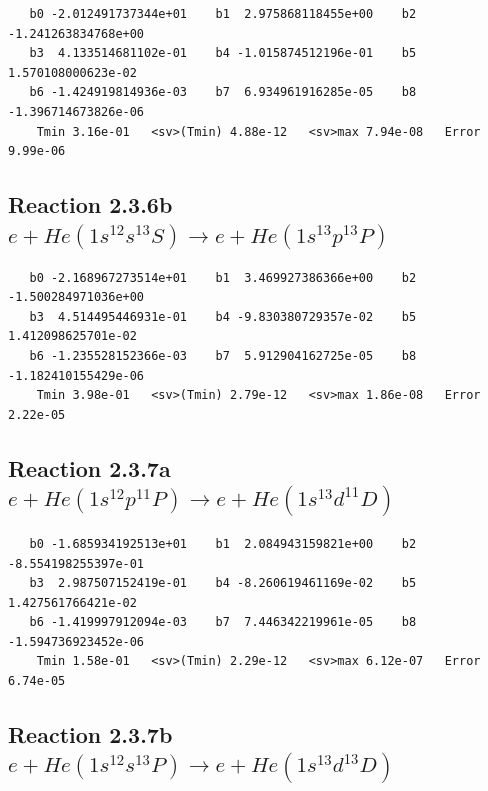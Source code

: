 \documentclass[12pt,dvipdfmx]{article}
\begin{document}
\begin{small}\begin{verbatim}
   b0 -2.012491737344e+01    b1  2.975868118455e+00    b2 -1.241263834768e+00
   b3  4.133514681102e-01    b4 -1.015874512196e-01    b5  1.570108000623e-02
   b6 -1.424919814936e-03    b7  6.934961916285e-05    b8 -1.396714673826e-06
    Tmin 3.16e-01   <sv>(Tmin) 4.88e-12   <sv>max 7.94e-08   Error 9.99e-06
\end{verbatim}\end{small}

\newpage
\subsection{
Reaction 2.3.6b $  e + He(1s^12s^13S) \rightarrow e + He(1s^13p^13P)$}


\begin{small}\begin{verbatim}
   b0 -2.168967273514e+01    b1  3.469927386366e+00    b2 -1.500284971036e+00
   b3  4.514495446931e-01    b4 -9.830380729357e-02    b5  1.412098625701e-02
   b6 -1.235528152366e-03    b7  5.912904162725e-05    b8 -1.182410155429e-06
    Tmin 3.98e-01   <sv>(Tmin) 2.79e-12   <sv>max 1.86e-08   Error 2.22e-05
\end{verbatim}\end{small}

\newpage
\subsection{
Reaction 2.3.7a $  e + He(1s^12p^11P) \rightarrow e + He(1s^13d^11D)$}


\begin{small}\begin{verbatim}
   b0 -1.685934192513e+01    b1  2.084943159821e+00    b2 -8.554198255397e-01
   b3  2.987507152419e-01    b4 -8.260619461169e-02    b5  1.427561766421e-02
   b6 -1.419997912094e-03    b7  7.446342219961e-05    b8 -1.594736923452e-06
    Tmin 1.58e-01   <sv>(Tmin) 2.29e-12   <sv>max 6.12e-07   Error 6.74e-05
\end{verbatim}\end{small}








\newpage
\subsection{
Reaction 2.3.7b $  e + He(1s^12s^13P) \rightarrow e + He(1s^13d^13D)$}
\end{document}
